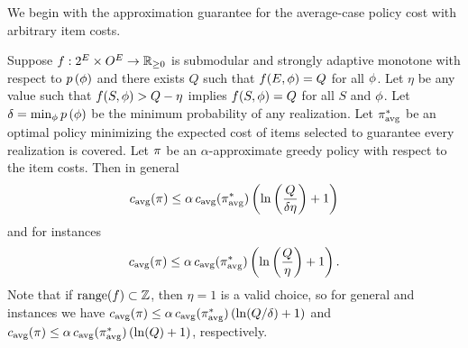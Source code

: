 \noindent
We begin with the approximation guarantee for the average-case 
%
policy cost with arbitrary item costs.


%

%
%
%
%
%
%
%
%
%
%
%
%
%
%
%
%
%

%


\begin{theorem} \label{thm:min-set-cover-avg-generalized-with-costs}
Suppose $f:2^{E} \times O^{E} \to
\mathbb{R}_{\ge 0}$ is \term submodular and strongly adaptive
monotone with respect to ${\color{black}{\ensuremath{p \left( {{\color{black}{\ensuremath{\phi}}}} \right) }}}$ and there exists $Q$ such that 
$f(E, {\color{black}{\ensuremath{\phi}}}) = Q$ for all ${\color{black}{\ensuremath{\phi}}}$.
Let $\eta$ be any value such that 
$f(S, {\color{black}{\ensuremath{\phi}}}) > Q - \eta$ implies $f(S, {\color{black}{\ensuremath{\phi}}}) = Q$ for all $S$ and
${\color{black}{\ensuremath{\phi}}}$.
Let $\delta = \min_{{\color{black}{\ensuremath{\phi}}}} {\color{black}{\ensuremath{p \left( {{\color{black}{\ensuremath{\phi}}}} \right) }}}$ be the minimum probability of
any realization.
%
%
Let
$\pi_{\text{avg}}^*$ be an optimal policy
minimizing the expected cost of items selected 
to guarantee every realization is covered.
Let $\pi$ be an $\alpha$-approximate
greedy policy with respect to the item costs.
%
%
%
Then in general 
\[
{c_{\text{avg}}{(\pi)}} \le  \alpha\,
{c_{\text{avg}}{(\pi_{\text{avg}}^*)}} \left( {\ln  \left( {\frac{Q}{\delta \eta}} \right)  + 1} \right)  
\]
and for \certifying instances 
\[
{c_{\text{avg}}{(\pi)}} \le  \alpha\,
{c_{\text{avg}}{(\pi_{\text{avg}}^*)}} \left( {\ln  \left( {\frac{Q}{\eta}} \right)  + 1} \right)  
\mbox{.}
\]
Note that if $\operatorname{range}(f) \subset \mathbb{Z}$, then $\eta = 1$ is a valid
choice, so for general and
\certifying instances we have ${c_{\text{avg}}{(\pi)}} \le  \alpha\,{c_{\text{avg}}{(\pi_{\text{avg}}^*)}} \left( {\ln (Q/\delta) + 1} \right) $
and ${c_{\text{avg}}{(\pi)}} \le
\alpha\,{c_{\text{avg}}{(\pi_{\text{avg}}^*)}} \left( {\ln (Q) + 1} \right) $, respectively.
%
%
%
%
%
%
%
%
%
%
%
%
%
%
%
%
%
%
%
%
%
%
\end{theorem}

%

%



